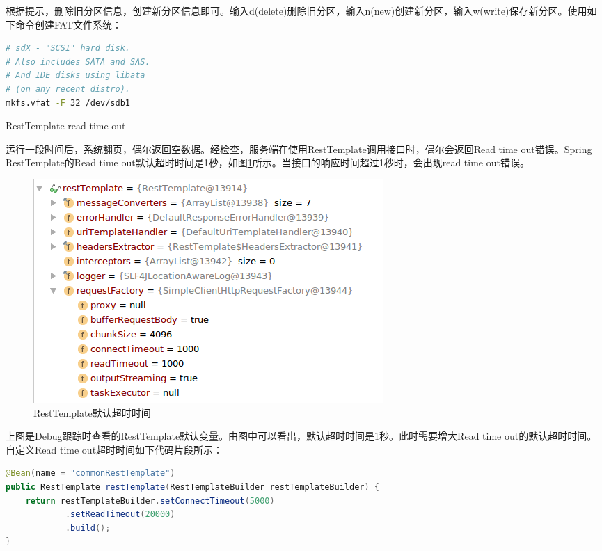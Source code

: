 \documentclass[8pt]{book}
\makeatletter
\numberwithin{dummy}{section}
\theoremstyle{ocrenumbox}
\theoremstyle{blacknumex}
\theoremstyle{blacknumbox}
\theoremstyle{ocrenum}
\renewcommand{\subsection}{\@startsection {subsection}{2}{\z@}
	{-3ex \@plus -0.1ex \@minus -.4ex}
	{0.5ex \@plus.2ex }
	{\normalfont\sffamily\bfseries}}
\makeatother
\begin{document}
根据提示，删除旧分区信息，创建新分区信息即可。输入d(delete)删除旧分区，输入n(new)创建新分区，输入w(write)保存新分区。使用如下命令创建FAT文件系统：

\begin{lstlisting}[language=Bash]
# sdX - "SCSI" hard disk. 
# Also includes SATA and SAS. 
# And IDE disks using libata 
# (on any recent distro).
mkfs.vfat -F 32 /dev/sdb1
\end{lstlisting}

\subsection{RestTemplate read time out}

运行一段时间后，系统翻页，偶尔返回空数据。经检查，服务端在使用RestTemplate调用接口时，偶尔会返回Read time out错误。Spring RestTemplate的Read time out默认超时时间是1秒，如图\ref{fig:resttempldatedefaulttimeout}所示。当接口的响应时间超过1秒时，会出现read time out错误。

\begin{figure}[htbp]
	\centering
	\includegraphics[scale=0.5]{resttempldatedefaulttimeout.png}
	\caption{RestTemplate默认超时时间}
	\label{fig:resttempldatedefaulttimeout}
\end{figure}

上图是Debug跟踪时查看的RestTemplate默认变量。由图中可以看出，默认超时时间是1秒。此时需要增大Read time out的默认超时时间。自定义Read time out超时时间如下代码片段所示：

\begin{lstlisting}[language=Java]
@Bean(name = "commonRestTemplate")
public RestTemplate restTemplate(RestTemplateBuilder restTemplateBuilder) {
	return restTemplateBuilder.setConnectTimeout(5000)
			.setReadTimeout(20000)
			.build();
}
\end{lstlisting}
\end{document}

